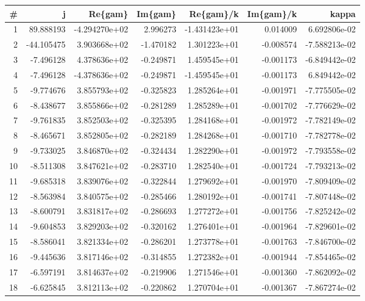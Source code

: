 \begin{tabular}{rrrrrrr}
\toprule
   \# &          j &       Re\{gam\} &   Im\{gam\} &     Re\{gam\}/k &  Im\{gam\}/k &         kappa \\
\midrule
   1 &  89.888193 & -4.294270e+02 &  2.996273 & -1.431423e+01 &   0.014009 &  6.692806e-02 \\
   2 & -44.105475 &  3.903668e+02 & -1.470182 &  1.301223e+01 &  -0.008574 & -7.588213e-02 \\
   3 &  -7.496128 &  4.378636e+02 & -0.249871 &  1.459545e+01 &  -0.001173 & -6.849442e-02 \\
   4 &  -7.496128 & -4.378636e+02 & -0.249871 & -1.459545e+01 &  -0.001173 &  6.849442e-02 \\
   5 &  -9.774676 &  3.855793e+02 & -0.325823 &  1.285264e+01 &  -0.001971 & -7.775505e-02 \\
   6 &  -8.438677 &  3.855866e+02 & -0.281289 &  1.285289e+01 &  -0.001702 & -7.776629e-02 \\
   7 &  -9.761835 &  3.852503e+02 & -0.325395 &  1.284168e+01 &  -0.001972 & -7.782149e-02 \\
   8 &  -8.465671 &  3.852805e+02 & -0.282189 &  1.284268e+01 &  -0.001710 & -7.782778e-02 \\
   9 &  -9.733025 &  3.846870e+02 & -0.324434 &  1.282290e+01 &  -0.001972 & -7.793558e-02 \\
  10 &  -8.511308 &  3.847621e+02 & -0.283710 &  1.282540e+01 &  -0.001724 & -7.793213e-02 \\
  11 &  -9.685318 &  3.839076e+02 & -0.322844 &  1.279692e+01 &  -0.001970 & -7.809409e-02 \\
  12 &  -8.563984 &  3.840575e+02 & -0.285466 &  1.280192e+01 &  -0.001741 & -7.807448e-02 \\
  13 &  -8.600791 &  3.831817e+02 & -0.286693 &  1.277272e+01 &  -0.001756 & -7.825242e-02 \\
  14 &  -9.604853 &  3.829203e+02 & -0.320162 &  1.276401e+01 &  -0.001964 & -7.829601e-02 \\
  15 &  -8.586041 &  3.821334e+02 & -0.286201 &  1.273778e+01 &  -0.001763 & -7.846700e-02 \\
  16 &  -9.445636 &  3.817146e+02 & -0.314855 &  1.272382e+01 &  -0.001944 & -7.854465e-02 \\
  17 &  -6.597191 &  3.814637e+02 & -0.219906 &  1.271546e+01 &  -0.001360 & -7.862092e-02 \\
  18 &  -6.625845 &  3.812113e+02 & -0.220862 &  1.270704e+01 &  -0.001367 & -7.867274e-02 \\

\end{tabular}
